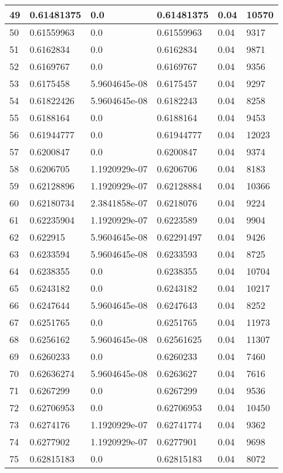 \begin{longtable}{|l|l|l|l|l|l|}
49 & 0.61481375 & 0.0 & 0.61481375 & 0.04 & 10570 \\ \hline 
50 & 0.61559963 & 0.0 & 0.61559963 & 0.04 & 9317 \\ \hline 
51 & 0.6162834 & 0.0 & 0.6162834 & 0.04 & 9871 \\ \hline 
52 & 0.6169767 & 0.0 & 0.6169767 & 0.04 & 9356 \\ \hline 
53 & 0.6175458 & 5.9604645e-08 & 0.6175457 & 0.04 & 9297 \\ \hline 
54 & 0.61822426 & 5.9604645e-08 & 0.6182243 & 0.04 & 8258 \\ \hline 
55 & 0.6188164 & 0.0 & 0.6188164 & 0.04 & 9453 \\ \hline 
56 & 0.61944777 & 0.0 & 0.61944777 & 0.04 & 12023 \\ \hline 
57 & 0.6200847 & 0.0 & 0.6200847 & 0.04 & 9374 \\ \hline 
58 & 0.6206705 & 1.1920929e-07 & 0.6206706 & 0.04 & 8183 \\ \hline 
59 & 0.62128896 & 1.1920929e-07 & 0.62128884 & 0.04 & 10366 \\ \hline 
60 & 0.62180734 & 2.3841858e-07 & 0.6218076 & 0.04 & 9224 \\ \hline 
61 & 0.62235904 & 1.1920929e-07 & 0.6223589 & 0.04 & 9904 \\ \hline 
62 & 0.622915 & 5.9604645e-08 & 0.62291497 & 0.04 & 9426 \\ \hline 
63 & 0.6233594 & 5.9604645e-08 & 0.6233593 & 0.04 & 8725 \\ \hline 
64 & 0.6238355 & 0.0 & 0.6238355 & 0.04 & 10704 \\ \hline 
65 & 0.6243182 & 0.0 & 0.6243182 & 0.04 & 10217 \\ \hline 
66 & 0.6247644 & 5.9604645e-08 & 0.6247643 & 0.04 & 8252 \\ \hline 
67 & 0.6251765 & 0.0 & 0.6251765 & 0.04 & 11973 \\ \hline 
68 & 0.6256162 & 5.9604645e-08 & 0.62561625 & 0.04 & 11307 \\ \hline 
69 & 0.6260233 & 0.0 & 0.6260233 & 0.04 & 7460 \\ \hline 
70 & 0.62636274 & 5.9604645e-08 & 0.6263627 & 0.04 & 7616 \\ \hline 
71 & 0.6267299 & 0.0 & 0.6267299 & 0.04 & 9536 \\ \hline 
72 & 0.62706953 & 0.0 & 0.62706953 & 0.04 & 10450 \\ \hline 
73 & 0.6274176 & 1.1920929e-07 & 0.62741774 & 0.04 & 9362 \\ \hline 
74 & 0.6277902 & 1.1920929e-07 & 0.6277901 & 0.04 & 9698 \\ \hline 
75 & 0.62815183 & 0.0 & 0.62815183 & 0.04 & 8072 \\ \hline 
\end{longtable}